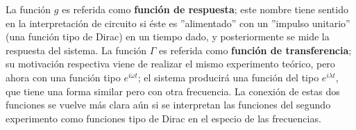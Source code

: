 La funci\'on $g$ es referida como \textbf{funci\'on de respuesta}; este nombre tiene sentido en la
interpretaci\'on de circuito si \'este es ''alimentado'' con un ''impulso unitario'' (una funci\'on
tipo \ddd de Dirac) en un tiempo dado, y posteriormente se mide la respuesta del sistema.
La funci\'on $\Gamma$ es referida como \textbf{funci\'on de transferencia}; su motivaci\'on
respectiva viene de realizar el mismo experimento te\'orico, pero ahora con una funci\'on
tipo $e^{i \omega t}$; el sistema producir\'a una funci\'on del tipo $e^{i\lambda t}$, que tiene
una forma similar pero con otra frecuencia. La conexi\'on de estas dos funciones se vuelve m\'as
clara a\'un si se interpretan las funciones del segundo experimento como funciones tipo
\ddd de Dirac en el especio de las frecuencias.



%

%
%

